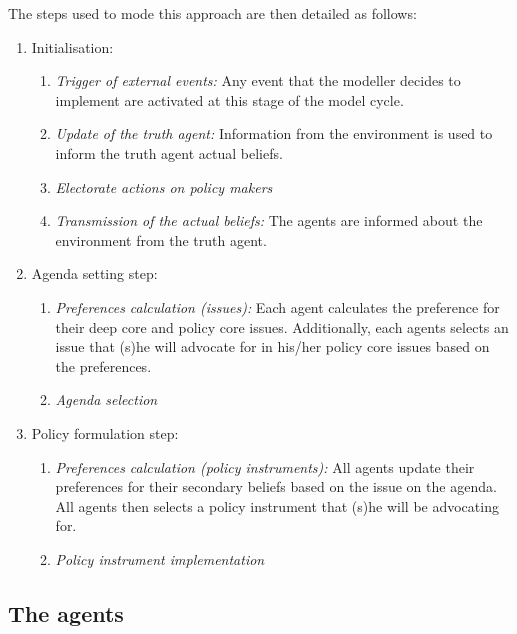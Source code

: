 \documentclass[11pt]{article}
\begin{document}
The steps used to mode this approach are then detailed as follows:

\begin{enumerate}
\item Initialisation:
	
	\begin{enumerate}
	\item \emph{Trigger of external events:} Any event that the modeller decides to implement are activated at this stage of the model cycle.
	\item \emph{Update of the truth agent:} Information from the environment is used to inform the truth agent actual beliefs.
	\item \emph{Electorate actions on policy makers}
	\item \emph{Transmission of the actual beliefs:} The agents are informed about the environment from the truth agent.
	\end{enumerate}
	
\item Agenda setting step:
	\begin{enumerate}
	\item \emph{Preferences calculation (issues):} Each agent calculates the preference for their deep core and policy core issues. Additionally, each agents selects an issue that (s)he will advocate for in his/her policy core issues based on the preferences.
	\item \emph{Agenda selection}
	\end{enumerate}
	
\item Policy formulation step:
	\begin{enumerate}
	\item \emph{Preferences calculation (policy instruments):} All agents update their preferences for their secondary beliefs based on the issue on the agenda. All agents then selects a policy instrument that (s)he will be advocating for.
	\item \emph{Policy instrument implementation} 
	\end{enumerate}

\end{enumerate}


\subsection{The agents}
\end{document}
